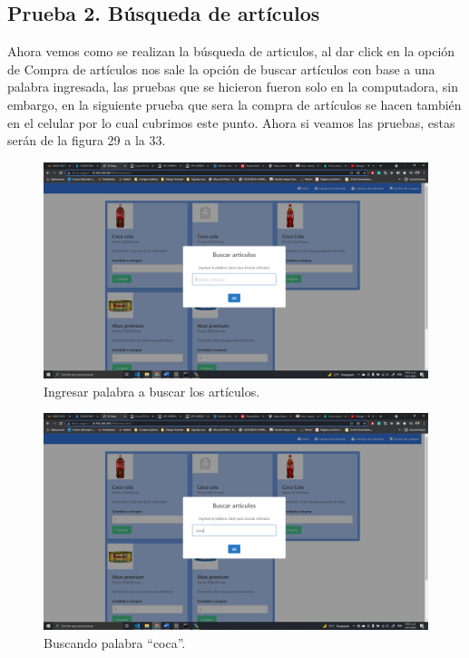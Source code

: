 \documentclass[11pt]{article}
\begin{document}
		\subsection{Prueba 2. Búsqueda de artículos}
		Ahora vemos como se realizan la búsqueda de articulos, al dar click en la opción de Compra de artículos nos sale la opción de buscar artículos con base a una palabra ingresada, las pruebas que se hicieron fueron solo en la computadora, sin embargo, en la siguiente prueba que sera la compra de artículos se hacen también en el celular por lo cual cubrimos este punto. Ahora si veamos las pruebas, estas serán de la figura 29 a la 33.
		\begin{figure}[H]
			\centering
			\includegraphics[scale=0.34]{resources/p2.1.png}
			\caption{Ingresar palabra a buscar los artículos.}\label{fig:picture}
		\end{figure}
		\begin{figure}[H]
			\centering
			\includegraphics[scale=0.34]{resources/p2.1.1.png}
			\caption{Buscando palabra ``coca''.}\label{fig:picture}
		\end{figure}
\end{document}
